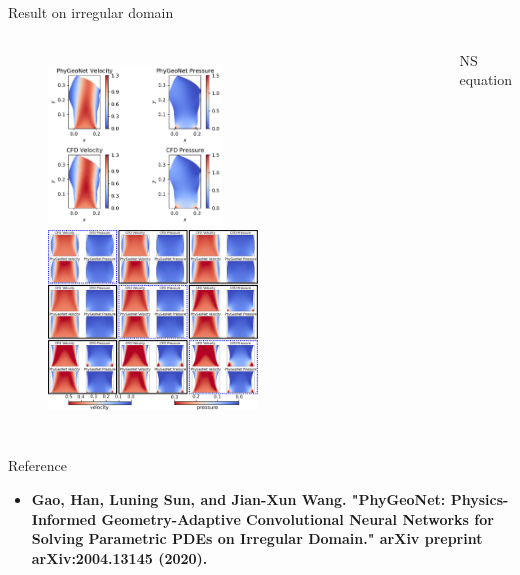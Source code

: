 \documentclass{beamer}
\begin{document}
\begin{frame}{Result on irregular domain}
\begin{columns}[c]
\begin{figure}
	\includegraphics[width=0.5\textwidth]{DetNS_15000VelMagAndPressure.pdf}
	\vfill
	\includegraphics[width=0.6\textwidth]{ParaNS_ResultContour.pdf}
\end{figure}
\centering
NS equation
\end{columns}
\end{frame}


\begin{frame}{Reference}
\begin{itemize}
\item \textbf{Gao, Han, Luning Sun, and Jian-Xun Wang. "PhyGeoNet: Physics-Informed Geometry-Adaptive Convolutional Neural Networks for Solving Parametric PDEs on Irregular Domain." arXiv preprint arXiv:2004.13145 (2020).}
\end{itemize}
\end{frame}
\end{document}
